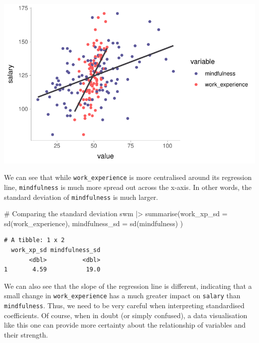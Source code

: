 \documentclass[
  letterpaper,
]{krantz}
\makeatletter
\newenvironment{Shaded}{\begin{snugshade}}{\end{snugshade}}
\newcommand{\AttributeTok}[1]{\textcolor[rgb]{0.40,0.45,0.13}{#1}}
\newcommand{\CommentTok}[1]{\textcolor[rgb]{0.37,0.37,0.37}{#1}}
\newcommand{\FunctionTok}[1]{\textcolor[rgb]{0.28,0.35,0.67}{#1}}
\newcommand{\NormalTok}[1]{\textcolor[rgb]{0.00,0.23,0.31}{#1}}
\newcommand{\SpecialCharTok}[1]{\textcolor[rgb]{0.37,0.37,0.37}{#1}}
\newenvironment{kframe}{%
\medskip{}
\setlength{\fboxsep}{.8em}
 \def\at@end@of@kframe{}%
 \ifinner\ifhmode%
  \def\at@end@of@kframe{\end{minipage}}%
  \begin{minipage}{\columnwidth}%
 \fi\fi%
 \def\FrameCommand##1{\hskip\@totalleftmargin \hskip-\fboxsep
 \colorbox{shadecolor}{##1}\hskip-\fboxsep
     \hskip-\linewidth \hskip-\@totalleftmargin \hskip\columnwidth}%
 \MakeFramed {\advance\hsize-\width
   \@totalleftmargin\z@ \linewidth\hsize
   \@setminipage}}%
 {\par\unskip\endMakeFramed%
 \at@end@of@kframe}
\renewenvironment{Shaded}{\begin{kframe}}{\end{kframe}}
\makeatother
\begin{document}
\includegraphics{13_regressions_files/figure-latex/visualising-swm-regression-1.pdf}

We can see that while \texttt{work\_experience} is more centralised
around its regression line, \texttt{mindfulness} is much more spread out
across the x-axis. In other words, the standard deviation of
\texttt{mindfulness} is much larger.

\begin{Shaded}
\begin{Highlighting}[]
\CommentTok{\# Comparing the standard deviation}
\NormalTok{swm }\SpecialCharTok{|\textgreater{}}
  \FunctionTok{summarise}\NormalTok{(}\AttributeTok{work\_xp\_sd =} \FunctionTok{sd}\NormalTok{(work\_experience),}
            \AttributeTok{mindfulness\_sd =} \FunctionTok{sd}\NormalTok{(mindfulness)}
\NormalTok{            )}
\end{Highlighting}
\end{Shaded}

\begin{verbatim}
# A tibble: 1 x 2
  work_xp_sd mindfulness_sd
       <dbl>          <dbl>
1       4.59           19.0
\end{verbatim}

We can also see that the slope of the regression line is different,
indicating that a small change in \texttt{work\_experience} has a much
greater impact on \texttt{salary} than \texttt{mindfulness}. Thus, we
need to be very careful when interpreting standardised coefficients. Of
course, when in doubt (or simply confused), a data visualisation like
this one can provide more certainty about the relationship of variables
and their strength.
\end{document}

